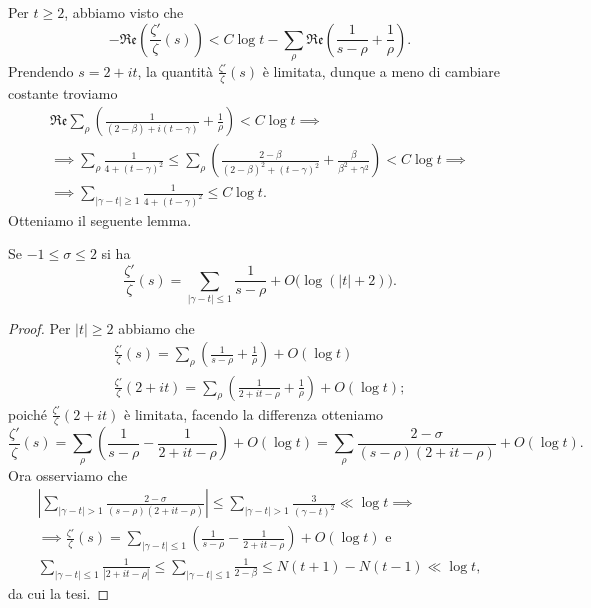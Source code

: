 Per $t \ge 2$, abbiamo visto che
$$-\mathfrak{Re}\left(\frac{\zeta'}{\zeta}(s)\right)<C\log{t}-\sum_{\rho} \mathfrak{Re}\left(\frac{1}{s-\rho}+\frac{1}{\rho}\right).$$
Prendendo $s=2+it$, la quantità $\frac{\zeta'}{\zeta}(s)$ è limitata, dunque a meno di cambiare costante troviamo
\begin{gather*}
  \mathfrak{Re}\sum_{\rho}\left(\frac{1}{(2-\beta)+i(t-\gamma)}+\frac{1}{\rho}\right)<C\log{t} \implies \\
  \implies \sum_{\rho} \frac{1}{4+(t-\gamma)^2} \le \sum_{\rho} \left(\frac{2-\beta}{(2-\beta)^2+(t-\gamma)^2}+\frac{\beta}{\beta^2+\gamma^2}\right)<C\log{t} \implies \\
  \implies \sum_{|\gamma-t| \ge 1} \frac{1}{4+(t-\gamma)^2} \le C\log{t}.
\end{gather*}
Otteniamo il seguente lemma.

\begin{lm} \label{zprimoz}
  Se $-1 \le \sigma \le 2$ si ha
  $$\frac{\zeta'}{\zeta}(s)=\sum_{|\gamma-t| \le 1} \frac{1}{s-\rho}+O\big(\log(|t|+2)\big).$$
\end{lm}

\begin{proof}
  Per $|t| \ge 2$ abbiamo che
  \begin{gather*}
    \frac{\zeta'}{\zeta}(s)=\sum_{\rho} \left(\frac{1}{s-\rho}+\frac{1}{\rho}\right)+O(\log{t}) \\
    \frac{\zeta'}{\zeta}(2+it)=\sum_{\rho}\left(\frac{1}{2+it-\rho}+\frac{1}{\rho}\right)+O(\log{t});
  \end{gather*}
  poiché $\frac{\zeta'}{\zeta}(2+it)$ è limitata, facendo la differenza otteniamo
  $$\frac{\zeta'}{\zeta}(s)=\sum_{\rho} \left(\frac{1}{s-\rho}-\frac{1}{2+it-\rho}\right)+O(\log{t})=\sum_{\rho} \frac{2-\sigma}{(s-\rho)(2+it-\rho)}+O(\log{t}).$$
  Ora osserviamo che
  \begin{gather*}
    \left| \sum_{|\gamma-t|>1} \frac{2-\sigma}{(s-\rho)(2+it-\rho)}\right| \le \sum_{|\gamma-t|>1} \frac{3}{(\gamma-t)^2} \ll \log{t} \implies \\
    \implies \frac{\zeta'}{\zeta}(s)=\sum_{|\gamma-t| \le 1} \left(\frac{1}{s-\rho}-\frac{1}{2+it-\rho}\right)+O(\log{t}) \text{ e} \\
    \sum_{|\gamma-t| \le 1} \frac{1}{|2+it-\rho|} \le \sum_{|\gamma-t| \le 1} \frac{1}{2-\beta} \le N(t+1)-N(t-1) \ll \log{t},
  \end{gather*}
  da cui la tesi.
\end{proof}

